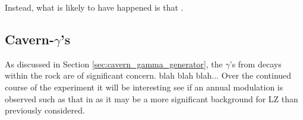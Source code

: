 \par
Instead, what is likely to have happened is that \cite{KamLAND_LS_contaminants_ref}.


\subsection{Cavern-$\gamma$'s}
\par
As discussed in Section \ref{sec:cavern_gamma_generator}, the $\gamma$'s from decays within the rock are of significant concern.
blah blah blah...
Over the continued course of the experiment it will be interesting see if an annual modulation is observed such as that in \cite{cavern_gamma_annual_modulation_CoGeNT_ref, cavern_gammas_in_Soudan_mine_ref} as it may be a more significant background for LZ than previously considered.